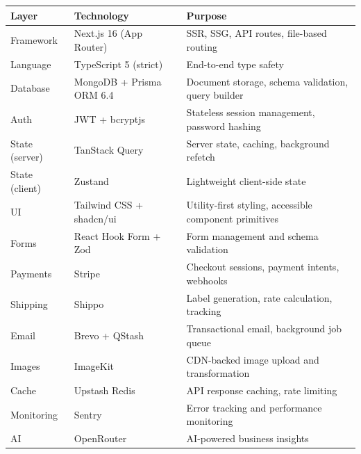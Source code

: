 \documentclass[12pt,a4paper]{report}
\begin{document}
\begin{center}
\begin{tabularx}{\textwidth}{llX}
  \toprule
  \textbf{Layer} & \textbf{Technology} & \textbf{Purpose} \\
  \midrule
  Framework    & Next.js 16 (App Router) & SSR, SSG, API routes, file-based routing \\
  Language     & TypeScript 5 (strict)   & End-to-end type safety \\
  Database     & MongoDB + Prisma ORM 6.4 & Document storage, schema validation, query builder \\
  Auth         & JWT + bcryptjs           & Stateless session management, password hashing \\
  State (server) & TanStack Query         & Server state, caching, background refetch \\
  State (client) & Zustand                & Lightweight client-side state \\
  UI           & Tailwind CSS + shadcn/ui & Utility-first styling, accessible component primitives \\
  Forms        & React Hook Form + Zod    & Form management and schema validation \\
  Payments     & Stripe                   & Checkout sessions, payment intents, webhooks \\
  Shipping     & Shippo                   & Label generation, rate calculation, tracking \\
  Email        & Brevo + QStash           & Transactional email, background job queue \\
  Images       & ImageKit                 & CDN-backed image upload and transformation \\
  Cache        & Upstash Redis            & API response caching, rate limiting \\
  Monitoring   & Sentry                   & Error tracking and performance monitoring \\
  AI           & OpenRouter               & AI-powered business insights \\
  \bottomrule
\end{tabularx}
\end{center}

\end{document}
